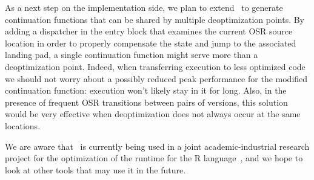 As a next step on the implementation side, we plan to extend \osrkit\ to generate continuation functions that can be shared by multiple deoptimization points. By adding a dispatcher in the entry block that examines the current OSR source location in order to properly compensate the state and jump to the associated landing pad, a single continuation function might serve more than a deoptimization point. Indeed, when transferring execution to less optimized code we should not worry about a possibly reduced peak performance for the modified continuation function: execution won't likely stay in it for long. Also, in the presence of frequent OSR transitions between pairs of versions, this solution would be very effective when deoptimization does not always occur at the same locations.


We are aware that \osrkit\ is currently being used in a joint academic-industrial research project for the optimization of the runtime for the R language~\cite{vitek16}, and we hope to look at other tools that may use it in the future.